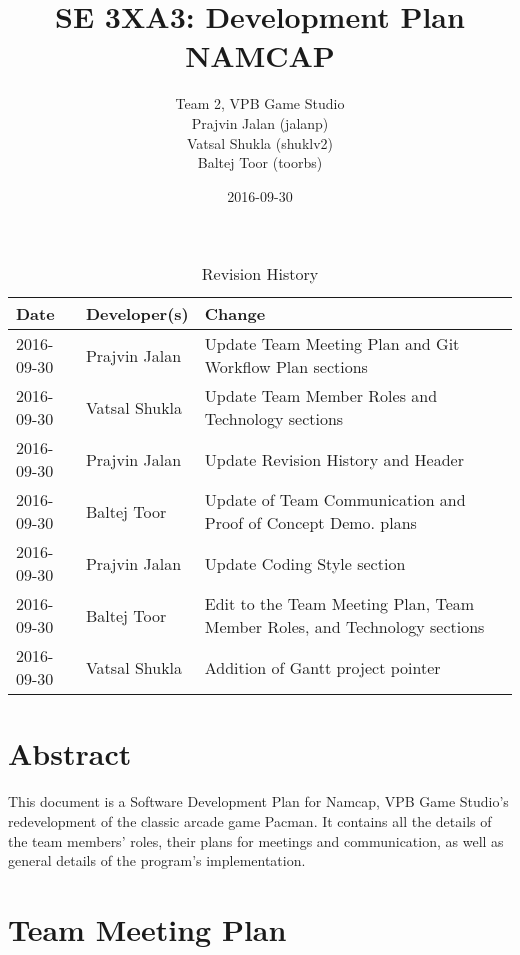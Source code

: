 \documentclass{article}
\title{SE 3XA3: Development Plan\\NAMCAP}
\author{Team 2, VPB Game Studio
		\\ Prajvin Jalan (jalanp)
		\\ Vatsal Shukla (shuklv2)
		\\ Baltej Toor (toorbs)
}
\date{2016-09-30}
\begin{document}
\begin{table}[hp]
\caption{Revision History} \label{TblRevisionHistory}
\begin{tabularx}{\textwidth}{llX}
\toprule
\textbf{Date} & \textbf{Developer(s)} & \textbf{Change}\\
\midrule
2016-09-30 & Prajvin Jalan & Update Team Meeting Plan and Git Workflow Plan sections\\
2016-09-30 & Vatsal Shukla & Update Team Member Roles and Technology sections \\
2016-09-30 & Prajvin Jalan & Update Revision History and Header\\
2016-09-30 & Baltej Toor & Update of Team Communication and Proof of Concept Demo. plans\\
2016-09-30 & Prajvin Jalan & Update Coding Style section\\
2016-09-30 & Baltej Toor & Edit to the Team Meeting Plan, Team Member Roles, and Technology sections\\ 
2016-09-30 & Vatsal Shukla & Addition of Gantt project pointer\\
\bottomrule
\end{tabularx}
\end{table}

\newpage

\maketitle

\section*{\hfil Abstract \hfil}
This document is a Software Development Plan for Namcap, VPB Game Studio's redevelopment of the classic arcade game Pacman. It contains all the details of the team members' roles, their plans for meetings and communication, as well as general details of the program's implementation.

\section{Team Meeting Plan}

\paragraph{}
\end{document}

